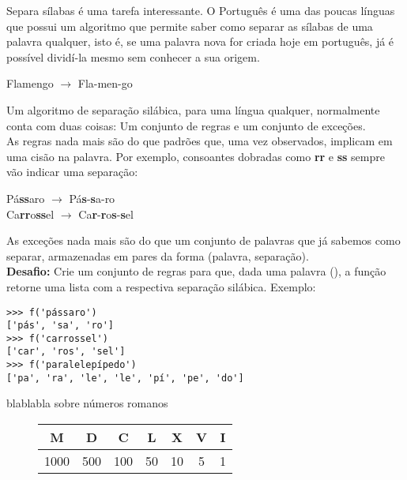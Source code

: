 	
	
	Separa sílabas é uma tarefa interessante. O Português é uma das poucas línguas que possui um algoritmo que permite saber como separar as sílabas de uma palavra qualquer, isto é, se uma palavra nova for criada hoje em português, já é possível dividí-la mesmo sem conhecer a sua origem.
	
	\begin{center}
		Flamengo $\to$ Fla-men-go
	\end{center}
	
	Um algoritmo de separação silábica, para uma língua qualquer, normalmente conta com duas coisas: Um conjunto de regras e um conjunto de exceções.\\
	
	As regras nada mais são do que padrões que, uma vez observados, implicam em uma cisão na palavra. Por exemplo, consoantes dobradas como \textbf{rr} e \textbf{ss} sempre vão indicar uma separação:
	
	\begin{center}
		Pá\textbf{ss}aro $\to$ Pá\textbf{s}-\textbf{s}a-ro\\
		Ca\textbf{rr}o\textbf{ss}el $\to$ Ca\textbf{r}-\textbf{r}o\textbf{s}-\textbf{s}el
	\end{center}
	
	As exceções nada mais são do que um conjunto de palavras que já sabemos como separar, armazenadas em pares da forma (palavra, separação).\\
	
	\textbf{Desafio:} Crie um conjunto de regras para que, dada uma palavra (), a função retorne uma lista com a respectiva separação silábica. Exemplo:
	
	\begin{lstlisting}[caption="Separando sílabas"]
>>> f('pássaro')
['pás', 'sa', 'ro']
>>> f('carrossel')
['car', 'ros', 'sel']
>>> f('paralelepípedo')
['pa', 'ra', 'le', 'le', 'pí', 'pe', 'do']
	\end{lstlisting}
	
	
	blablabla sobre números romanos\\
	
	\begin{figure}[H]
		\centering
		\begin{tabular}{|c|c|c|c|c|c|c|}
		\hline		
		M & D & C & L & X & V & I\\
		\hline
		1000 & 500 & 100 & 50 & 10 & 5 & 1\\
		\hline
		\end{tabular}
	\end{figure}
	
